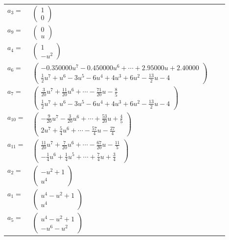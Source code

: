 \documentclass[1p]{elsarticle_modified}
\theoremstyle{definition}
\begin{document}
\begin{tabular}{m{7pt} m{180pt} m{7pt} m{180pt} }
\flushright $a_{3}=$&$\begin{pmatrix}1\\0\end{pmatrix}$ \\
\flushright $a_{9}=$&$\begin{pmatrix}0\\u\end{pmatrix}$ \\
\flushright $a_{4}=$&$\begin{pmatrix}1\\- u^2\end{pmatrix}$ \\
\flushright $a_{6}=$&$\begin{pmatrix}-0.350000 u^{7}-0.450000 u^{6}+\cdots+2.95000 u+2.40000\\\frac{1}{2} u^7+u^6-3 u^5-6 u^4+4 u^3+6 u^2-\frac{13}{2} u-4\end{pmatrix}$ \\
\flushright $a_{7}=$&$\begin{pmatrix}\frac{3}{20} u^7+\frac{11}{20} u^6+\cdots-\frac{71}{20} u-\frac{8}{5}\\\frac{1}{2} u^7+u^6-3 u^5-6 u^4+4 u^3+6 u^2-\frac{13}{2} u-4\end{pmatrix}$ \\
\flushright $a_{10}=$&$\begin{pmatrix}-\frac{9}{20} u^7-\frac{3}{20} u^6+\cdots+\frac{53}{20} u+\frac{4}{5}\\2 u^7+\frac{5}{4} u^6+\cdots-\frac{57}{4} u-\frac{27}{4}\end{pmatrix}$ \\
\flushright $a_{11}=$&$\begin{pmatrix}\frac{11}{20} u^7+\frac{7}{20} u^6+\cdots-\frac{67}{20} u-\frac{11}{5}\\-\frac{1}{4} u^6+\frac{1}{4} u^5+\cdots+\frac{7}{4} u+\frac{3}{4}\end{pmatrix}$ \\
\flushright $a_{2}=$&$\begin{pmatrix}- u^2+1\\u^4\end{pmatrix}$ \\
\flushright $a_{1}=$&$\begin{pmatrix}u^4- u^2+1\\u^4\end{pmatrix}$ \\
\flushright $a_{5}=$&$\begin{pmatrix}u^4- u^2+1\\- u^6- u^2\end{pmatrix}$ \\

\end{tabular}
\end{document}
